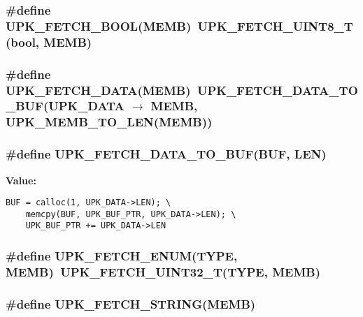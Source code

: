 \subsubsection{\setlength{\rightskip}{0pt plus 5cm}\#define UPK\_\-FETCH\_\-BOOL(MEMB)~UPK\_\-FETCH\_\-UINT8\_\-T(bool, MEMB)}\label{protocol_8h_c8f4b9aeab94a7cf42709c99ba83bc16}


\subsubsection{\setlength{\rightskip}{0pt plus 5cm}\#define UPK\_\-FETCH\_\-DATA(MEMB)~UPK\_\-FETCH\_\-DATA\_\-TO\_\-BUF(UPK\_\-DATA $\rightarrow$ MEMB, UPK\_\-MEMB\_\-TO\_\-LEN(MEMB))}\label{protocol_8h_b50e85a264d13320ba315df386df6d8b}


\subsubsection{\setlength{\rightskip}{0pt plus 5cm}\#define UPK\_\-FETCH\_\-DATA\_\-TO\_\-BUF(BUF, LEN)}\label{protocol_8h_f47a6936bf9fd97c518e5033c2e1d482}


\textbf{Value:}

\begin{Code}\begin{verbatim}BUF = calloc(1, UPK_DATA->LEN); \
    memcpy(BUF, UPK_BUF_PTR, UPK_DATA->LEN); \
    UPK_BUF_PTR += UPK_DATA->LEN
\end{verbatim}\end{Code}
\subsubsection{\setlength{\rightskip}{0pt plus 5cm}\#define UPK\_\-FETCH\_\-ENUM(TYPE, MEMB)~UPK\_\-FETCH\_\-UINT32\_\-T(TYPE, MEMB)}\label{protocol_8h_a8e82cfa7f3fce76d9bf5128d68bd3a1}


\subsubsection{\setlength{\rightskip}{0pt plus 5cm}\#define UPK\_\-FETCH\_\-STRING(MEMB)}\label{protocol_8h_0146e4437bb7b8292898a7c3a77443ac}


